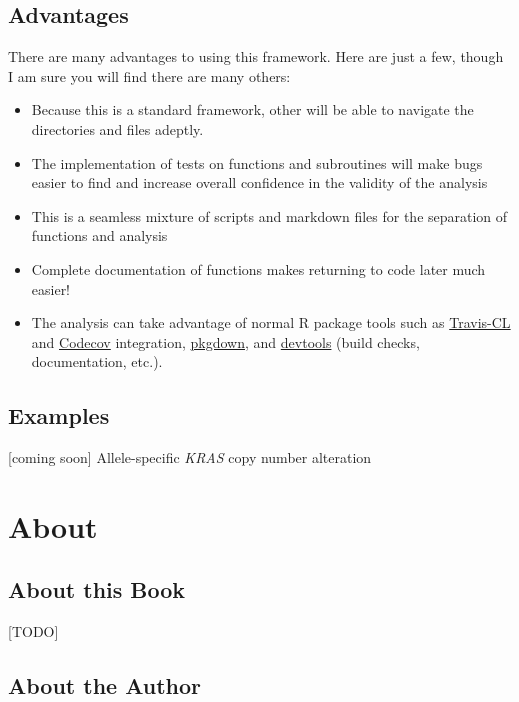 \documentclass[]{book}
\providecommand{\tightlist}{%
  \setlength{\itemsep}{0pt}\setlength{\parskip}{0pt}}
\begin{document}
\subsection*{Advantages}\label{advantages}

There are many advantages to using this framework. Here are just a few,
though I am sure you will find there are many others:

\begin{itemize}
\tightlist
\item
  Because this is a standard framework, other will be able to navigate
  the directories and files adeptly.
\item
  The implementation of tests on functions and subroutines will make
  bugs easier to find and increase overall confidence in the validity of
  the analysis
\item
  This is a seamless mixture of scripts and markdown files for the
  separation of functions and analysis
\item
  Complete documentation of functions makes returning to code later much
  easier!
\item
  The analysis can take advantage of normal R package tools such as
  \href{https://travis-ci.org}{Travis-CL} and
  \href{https://codecov.io}{Codecov} integration,
  \href{https://pkgdown.r-lib.org}{pkgdown}, and
  \href{https://devtools.r-lib.org}{devtools} (build checks,
  documentation, etc.).
\end{itemize}

\subsection*{Examples}\label{examples}

{[}coming soon{]} Allele-specific \emph{KRAS} copy number alteration

\section{About}\label{about}

\subsection*{About this Book}\label{about-this-book}

{[}TODO{]}

\subsection*{About the Author}\label{about-the-author}
\end{document}
